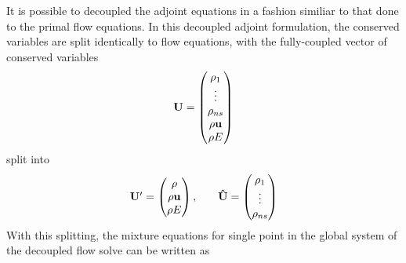 It is possible to decoupled the adjoint equations in a fashion similiar to that
done to the primal flow equations.  In this decoupled adjoint formulation, the
conserved variables are split identically to flow equations, with the
fully-coupled vector of conserved variables
\begin{equation}
	\mathbf U =
  \begin{pmatrix}
 		\rho_1    \\
		\vdots    \\
		\rho_{ns} \\
    \rho \mathbf u  \\
		\rho E    \\
	\end{pmatrix}
  \label{all-vars}
 \end{equation}
 split into
\begin{equation}
	\begin{matrix}
		\mathbf{U}'=\begin{pmatrix}
			\rho \\
			\rho \mathbf u \\
			\rho E
		\end{pmatrix},\quad &
		\mathbf{\hat{U}}=\begin{pmatrix}
			\rho_1 \\
			\vdots \\
			\rho_{ns}
		\end{pmatrix}
	\end{matrix}
  \label{dc-vars}
\end{equation}
With this splitting, the mixture equations for single point in the global system
of the decoupled flow solve can be written as
